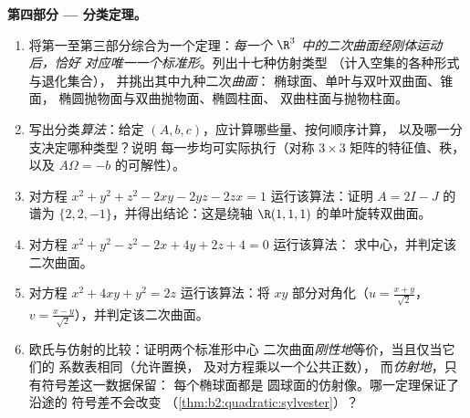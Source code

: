 \begin{problem}
\medskip
\noindent\textbf{第四部分 --- 分类定理。}
\begin{enumerate}[resume]
  \item 将第一至第三部分综合为一个定理：\emph{每一个
        $\R^3$ 中的二次曲面经刚体运动后，恰好
        对应唯一一个标准形}。列出十七种仿射类型
        （计入空集的各种形式与退化集合），
        并挑出其中九种二次\emph{曲面}：
        椭球面、单叶与双叶双曲面、锥面，
        椭圆抛物面与双曲抛物面、椭圆柱面、
        双曲柱面与抛物柱面。
  \item 写出分类\emph{算法}：给定 $(A,
        b, c)$，应计算哪些量、按何顺序计算，
        以及哪一分支决定哪种类型？说明
        每一步均可实际执行（对称
        $3\times3$ 矩阵的特征值、秩，
        以及 $A\Omega = -b$ 的可解性）。
  \item 对方程 $x^2 + y^2 + z^2 - 2xy - 2yz -
        2zx = 1$ 运行该算法：证明 $A = 2I - J$ 的谱为 $\{2, 2,
        -1\}$，并得出结论：这是绕轴
        $\R(1,1,1)$ 的单叶旋转双曲面。
  \item 对方程 $x^2 + y^2 - z^2 - 2x + 4y + 2z + 4 = 0$ 运行该算法：
        求中心，并判定该二次曲面。
  \item 对方程 $x^2 + 4xy + y^2 = 2z$ 运行该算法：将
        $xy$ 部分对角化（$u = \frac{x+y}{\sqrt2}$，$v =
        \frac{x-y}{\sqrt2}$），并判定该二次曲面。
  \item 欧氏与仿射的比较：证明两个标准形中心
        二次曲面\emph{刚性地}等价，当且仅当它们的
        系数表相同（允许置换，
        及对方程乘以一个公共正数），
        而\emph{仿射地}，只有符号差这一数据保留：
        每个椭球面都是
        圆球面的仿射像。哪一定理保证了沿途的
        符号差不会改变
        （\cref{thm:b2:quadratic:sylvester}）？
\end{enumerate}


\end{problem}

